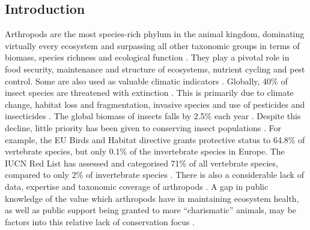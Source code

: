 \documentclass[11pt]{article}
\begin{document}
\begin{flushleft}
\clearpage

\section{Introduction}
Arthropods are the most species-rich phylum in the animal kingdom, dominating virtually every ecosystem and surpassing all other taxonomic groups in terms of biomass, species richness and ecological function \citep{baillie2012spineless, doi/10.2779/27353}. They play a pivotal role in food security, maintenance and structure of ecosystems, nutrient cycling and pest control. Some are also used as valuable climatic indicators \citep{baillie2012spineless}. Globally, 40\% of insect species are threatened with extinction \citep{sanchez2019worldwide}. This is primarily due to climate change, habitat loss and fragmentation, invasive species and use of pesticides and insecticides \citep{borrell2012one,doi/10.2779/27353,sanchez2021indirect,simaika2018insect}. The global biomass of insects falls by 2.5\% each year \citep{sanchez2019worldwide}. Despite this decline, little priority has been given to conserving insect populations \citep{baillie2012spineless,doi/10.2779/27353,donaldson2016taxonomic,prather2013invertebrates,simaika2018insect}. For example, the EU Birds and Habitat directive grants protective status to 64.8\% of vertebrate species, but only 0.1\% of the invertebrate species in Europe. The IUCN Red List has assessed and categorised 71\% of all vertebrate species, compared to only 2\% of invertebrate species \citep{karam2020conservation}. There is also a considerable lack of data, expertise and taxonomic coverage of arthropods \citep{donaldson2016taxonomic,karam2020conservation,simaika2018insect}. A gap in public knowledge of the value which arthropods have in maintaining ecosystem health, as well as public support being granted to more “charismatic” animals, may be factors into this relative lack of conservation focus \citep{baillie2012spineless,doi/10.2779/27353}.
\linebreak


\end{flushleft}
\end{document}
